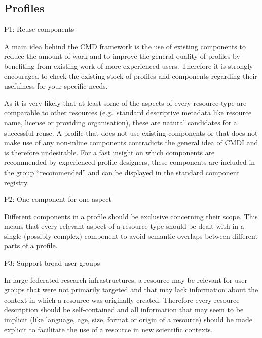 \subsection{Profiles}\label{profiles}

P1: Reuse components

 

A main idea behind the CMD framework is the use of existing components to reduce the amount of work and to improve the general quality of profiles by benefiting from existing work of more experienced users. Therefore it is strongly encouraged to check the existing stock of profiles and components regarding their usefulness for your specific needs.

As it is very likely that at least some of the aspects of every resource type are comparable to other resources (e.g.~standard descriptive metadata like resource name, license or providing organisation), these are natural candidates for a successful reuse. A profile that does not use existing components or that does not make use of any non-inline components contradicts the general idea of CMDI and is therefore undesirable. For a fast insight on which components are recommended by experienced profile designers, these components are included in the
group ``recommended'' and can be displayed in the standard component registry. 

P2: One component for one aspect


Different components in a profile should be exclusive concerning their scope. This means that every relevant aspect of a resource type should be dealt with in a single (possibly complex) component to avoid semantic overlaps between different parts of a profile.

P3: Support broad user groups


In large federated research infrastructures, a resource may be relevant for user groups that were not primarily targeted and that may lack information about the context in which a resource was originally created. Therefore every resource description should be self-contained and all information that may seem to be implicit (like language, age, size, format or origin of a resource) should be made explicit to facilitate the use of a resource in new scientific contexts.

